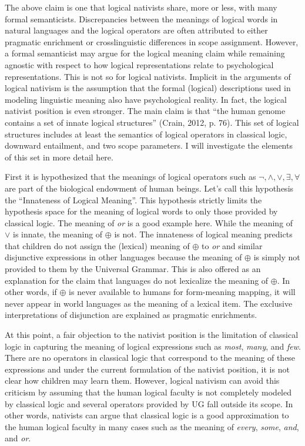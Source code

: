 \documentclass[oneside]{report}
\theoremstyle{definition}
\theoremstyle{definition}
\theoremstyle{definition}
\theoremstyle{remark}
\begin{document}
The above claim is one that logical nativists share, more or less, with
many formal semanticists. Discrepancies between the meanings of logical
words in natural languages and the logical operators are often
attributed to either pragmatic enrichment or crosslinguistic differences
in scope assignment. However, a formal semanticist may argue for the
logical meaning claim while remaining agnostic with respect to how
logical representations relate to psychological representations. This is
not so for logical nativists. Implicit in the arguments of logical
nativism is the assumption that the formal (logical) descriptions used
in modeling linguistic meaning also have psychological reality. In fact,
the logical nativist position is even stronger. The main claim is that
``the human genome contains a set of innate logical structures'' (Crain,
2012, p. 76). This set of logical structures includes at least the
semantics of logical operators in classical logic, downward entailment,
and two scope parameters. I will investigate the elements of this set in
more detail here.

First it is hypothesized that the meanings of logical operators such as
\(\lnot, \land, \lor, \exists, \forall\) are part of the biological
endowment of human beings. Let's call this hypothesis the ``Innateness
of Logical Meaning''. This hypothesis strictly limits the hypothesis
space for the meaning of logical words to only those provided by
classical logic. The meaning of \emph{or} is a good example here. While
the meaning of \(\lor\) is innate, the meaning of \(\oplus\) is not. The
innateness of logical meaning predicts that children do not assign the
(lexical) meaning of \(\oplus\) to \emph{or} and similar disjunctive
expressions in other languages because the meaning of \(\oplus\) is
simply not provided to them by the Universal Grammar. This is also
offered as an explanation for the claim that languages do not lexicalize
the meaning of \(\oplus\). In other words, if \(\oplus\) is never
available to humans for form-meaning mapping, it will never appear in
world languages as the meaning of a lexical item. The exclusive
interpretations of disjunction are explained as pragmatic enrichments.

At this point, a fair objection to the nativist position is the
limitation of classical logic in capturing the meaning of logical
expressions such as \emph{most}, \emph{many}, and \emph{few}. There are
no operators in classical logic that correspond to the meaning of these
expressions and under the current formulation of the nativist position,
it is not clear how children may learn them. However, logical nativism
can avoid this criticism by assuming that the human logical faculty is
not completely modeled by classical logic and several operators provided
by UG fall outside its scope. In other words, nativists can argue that
classical logic is a good approximation to the human logical faculty in
many cases such as the meaning of \emph{every}, \emph{some}, \emph{and},
and \emph{or}.
\end{document}
